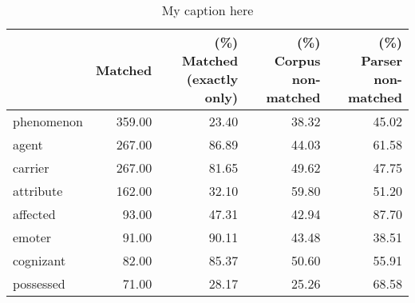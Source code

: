 \begin{table}[!ht]
\centering
\begin{tabular}{lrrrr}
\toprule
{} &  Matched &  (\%) Matched (exactly only) &  (\%) Corpus non-matched &  (\%) Parser non-matched \\
\midrule
phenomenon &   359.00 &                       23.40 &                   38.32 &                   45.02 \\
agent      &   267.00 &                       86.89 &                   44.03 &                   61.58 \\
carrier    &   267.00 &                       81.65 &                   49.62 &                   47.75 \\
attribute  &   162.00 &                       32.10 &                   59.80 &                   51.20 \\
affected   &    93.00 &                       47.31 &                   42.94 &                   87.70 \\
emoter     &    91.00 &                       90.11 &                   43.48 &                   38.51 \\
cognizant  &    82.00 &                       85.37 &                   50.60 &                   55.91 \\
possessed  &    71.00 &                       28.17 &                   25.26 &                   68.58 \\
\bottomrule
\end{tabular}
\caption{My caption here}
\label{tab:PARTICIPANT_ROLE-oe-relative}
\end{table}